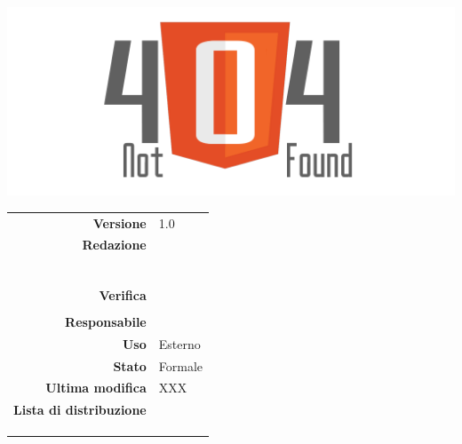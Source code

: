 \thispagestyle{empty}

\begin{titlepage}

	\begin{center}
	\begin{Huge}
		\textbf{\gruppo} \\
	\end{Huge}
	\vspace{0.5cm}
	\begin{Large}
		\textbf{\capitolato}
	\end{Large}
	
	\vspace{1cm}

	\includegraphics[scale=0.35]{../logo/logo404_Extends.png}
	\vspace{1cm}
	\begin{Huge}
		\textbf{\titDoc}
	\end{Huge}
	
	\vspace{1cm}
	
	\begin{table}[h]
	\begin{center}
	\begin{tabular}{r | l}
		\textbf{Versione} & 1.0 \\
		\textbf{Redazione} & \VeFe \\ 
			& \CoMa \\ 
			& \CaMa \\
			& \MaMo \\
			& \ReAn \\
			& \GoIs \\
			& \DeEn \\
		\textbf{Verifica} & \MaMo \\ 
			& \ReAn \\ 
		\textbf{Responsabile} & \GoIs \\
		\textbf{Uso} & Esterno \\
		\textbf{Stato} & Formale \\
		\textbf{Ultima modifica} & XXX \\
		\textbf{Lista di distribuzione} & \gruppo \\ 
			& \Vardanega \\
			& \Cardin \\
			& \Zucchetti \\
	\end{tabular}
	\end{center}
	\end{table}
	\end{center}
\end{titlepage}